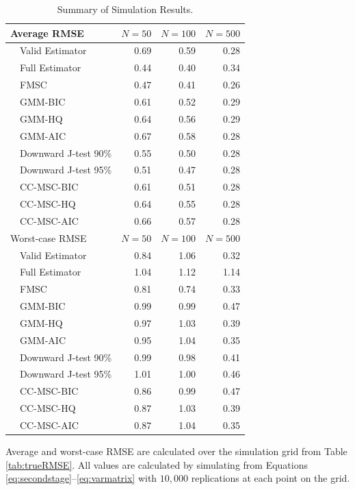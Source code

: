 \documentclass[12pt]{article}
\theoremstyle{definition}
\begin{document}
%
\begin{table}[!tbp]
\caption{Summary of Simulation Results.}
\label{tab:summary}
 \begin{center}
 \begin{tabular}{rlrrr}\hline\hline
\multicolumn{2}{l}{Average RMSE}&\multicolumn{1}{c}{$N=50$}&\multicolumn{1}{c}{$N=100$}&\multicolumn{1}{c}{$N=500$}\tabularnewline
\hline
&Valid Estimator&0.69&0.59&0.28\tabularnewline
&Full Estimator&0.44&0.40&0.34\tabularnewline
&FMSC&0.47&0.41&0.26\tabularnewline
&GMM-BIC&0.61&0.52&0.29\tabularnewline
&GMM-HQ&0.64&0.56&0.29\tabularnewline
&GMM-AIC&0.67&0.58&0.28\tabularnewline
&Downward J-test 90\%&0.55&0.50&0.28\tabularnewline
&Downward J-test 95\%&0.51&0.47&0.28\tabularnewline
&CC-MSC-BIC&0.61&0.51&0.28\tabularnewline
&CC-MSC-HQ&0.64&0.55&0.28\tabularnewline
&CC-MSC-AIC&0.66&0.57&0.28\tabularnewline
\hline\hline
\multicolumn{2}{l}{Worst-case RMSE}&\multicolumn{1}{c}{$N=50$}&\multicolumn{1}{c}{$N=100$}&\multicolumn{1}{c}{$N=500$}\tabularnewline
\hline
&Valid Estimator&0.84&1.06&0.32\tabularnewline
&Full Estimator&1.04&1.12&1.14\tabularnewline
&FMSC&0.81&0.74&0.33\tabularnewline
&GMM-BIC&0.99&0.99&0.47\tabularnewline
&GMM-HQ&0.97&1.03&0.39\tabularnewline
&GMM-AIC&0.95&1.04&0.35\tabularnewline
&Downward J-test 90\%&0.99&0.98&0.41\tabularnewline
&Downward J-test 95\%&1.01&1.00&0.46\tabularnewline
&CC-MSC-BIC&0.86&0.99&0.47\tabularnewline
&CC-MSC-HQ&0.87&1.03&0.39\tabularnewline
&CC-MSC-AIC&0.87&1.04&0.35\tabularnewline
\hline
\end{tabular}
\end{center}
\footnotesize
\begin{tablenotes}
	\item Average and worst-case RMSE are calculated over the simulation grid from Table \ref{tab:trueRMSE}. All values are calculated by simulating from Equations \ref{eq:secondstage}--\ref{eq:varmatrix} with $10,000$ replications at each point on the grid.
\end{tablenotes}
\end{table}
\end{document}
